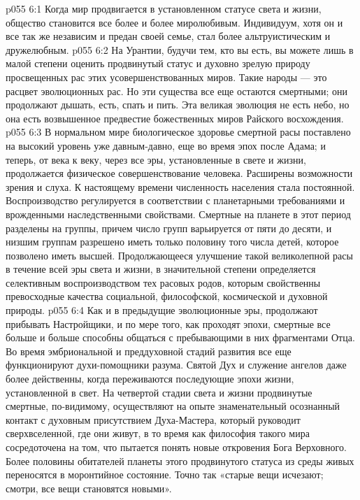 \vs p055 6:1 Когда мир продвигается в установленном статусе света и жизни, общество становится все более и более миролюбивым. Индивидуум, хотя он и все так же независим и предан своей семье, стал более альтруистическим и дружелюбным.
\vs p055 6:2 На Урантии, будучи тем, кто вы есть, вы можете лишь в малой степени оценить продвинутый статус и духовно зрелую природу просвещенных рас этих усовершенствованных миров. Такие народы --- это расцвет эволюционных рас. Но эти существа все еще остаются смертными; они продолжают дышать, есть, спать и пить. Эта великая эволюция не есть небо, но она есть возвышенное предвестие божественных миров Райского восхождения.
\vs p055 6:3 В нормальном мире биологическое здоровье смертной расы поставлено на высокий уровень уже давным\hyp{}давно, еще во время эпох после Адама; и теперь, от века к веку, через все эры, установленные в свете и жизни, продолжается физическое совершенствование человека. Расширены возможности зрения и слуха. К настоящему времени численность населения стала постоянной. Воспроизводство регулируется в соответствии с планетарными требованиями и врожденными наследственными свойствами. Смертные на планете в этот период разделены на группы, причем число групп варьируется от пяти до десяти, и низшим группам разрешено иметь только половину того числа детей, которое позволено иметь высшей. Продолжающееся улучшение такой великолепной расы в течение всей эры света и жизни, в значительной степени определяется селективным воспроизводством тех расовых родов, которым свойственны превосходные качества социальной, философской, космической и духовной природы.
\vs p055 6:4 \pc Как и в предыдущие эволюционные эры, продолжают прибывать Настройщики, и по мере того, как проходят эпохи, смертные все больше и больше способны общаться с пребывающими в них фрагментами Отца. Во время эмбриональной и преддуховной стадий развития все еще функционируют духи\hyp{}помощники разума. Святой Дух и служение ангелов даже более действенны, когда переживаются последующие эпохи жизни, установленной в свет. На четвертой стадии света и жизни продвинутые смертные, по\hyp{}видимому, осуществляют на опыте знаменательный осознанный контакт с духовным присутствием Духа\hyp{}Мастера, который руководит сверхвселенной, где они живут, в то время как философия такого мира сосредоточена на том, что пытается понять новые откровения Бога Верховного. Более половины обитателей планеты этого продвинутого статуса из среды живых переносятся в моронтийное состояние. Точно так «старые вещи исчезают; смотри, все вещи становятся новыми».
